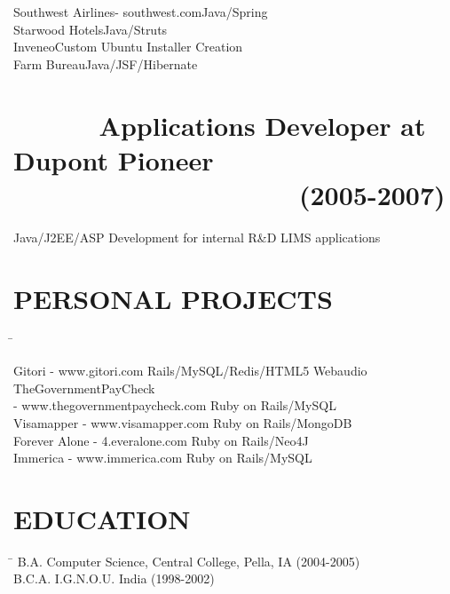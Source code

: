 \documentclass{res}
\begin{document}
\begin{resume}
\begin{tabbing}
Southwest Airlines- southwest.com\>Java/Spring \\

Starwood Hotels\>Java/Struts\\

Inveneo\>Custom Ubuntu Installer Creation\\

Farm Bureau\>Java/JSF/Hibernate \\
 \end{tabbing}
\vspace{-0.4in}
\section {\ \ \ \ \ \ Applications Developer at Dupont Pioneer \textnormal{\ \ \ \ \ \ \ \ \ \ \ \  \ \ \ \ \ \ \ \ (2005-2007)}}\vspace{0.05in}
   \begin{tabbing}
Java/J2EE/ASP Development for internal R\&D LIMS applications
\end{tabbing}
\vspace{0.1in}         
\section{PERSONAL PROJECTS}  \vspace{-0.01in}   
   \begin{tabbing}
   \hspace{3.3in}\= \kill %

    Gitori - www.gitori.com   \>Rails/MySQL/Redis/HTML5 Webaudio \\

    TheGovernmentPayCheck \\- www.thegovernmentpaycheck.com   \>Ruby on Rails/MySQL\\

    Visamapper - www.visamapper.com   \>Ruby on Rails/MongoDB \\
 
    Forever Alone - 4.everalone.com \>Ruby on Rails/Neo4J \\

    Immerica - www.immerica.com \>Ruby on Rails/MySQL\\

\end{tabbing}

\section{EDUCATION}\vspace{0.05in}
\begin{tabbing}
\hspace{3.3in}\= \kill %
        B.A. Computer Science, Central College, Pella, IA  \>(2004-2005) \\
        B.C.A. I.G.N.O.U. India  \>(1998-2002) \\
\end{tabbing}
\vspace{-0.2in}

\end{resume}
\end{document}

